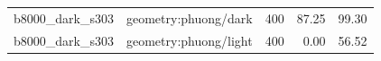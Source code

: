 \begin{longtable}{l>{\raggedright\arraybackslash}p{.42\linewidth}rrr}
b8000\_\allowbreak{}dark\_\allowbreak{}s303 & %
geometry:phuong/dark & %
400 & %
87.25 & %
99.30 \\ %

b8000\_\allowbreak{}dark\_\allowbreak{}s303 & %
geometry:phuong/light & %
400 & %
0.00 & %
56.52 \\ %


\end{longtable}
